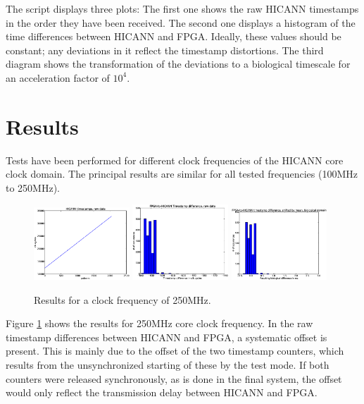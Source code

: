 \documentclass{article}
\begin{document}
The script displays three plots:
The first one shows the raw HICANN timestamps in the order they have been received.
The second one displays a histogram of the time differences between HICANN and FPGA.
Ideally, these values should be constant; any deviations in it reflect the timestamp distortions.
The third diagram shows the transformation of the deviations to a biological timescale for an acceleration factor of $10^4$.

\section{Results}

Tests have been performed for different clock frequencies of the HICANN core clock domain.
The principal results are similar for all tested frequencies (100MHz to 250MHz).

\begin{figure}
\includegraphics[width=0.32\textwidth ]{fig1_250mhz}
\includegraphics[width=0.32\textwidth ]{fig2_250mhz}
\includegraphics[width=0.32\textwidth ]{fig3_250mhz}
\caption{\label{fig_results} Results for a clock frequency of 250MHz.}
\end{figure}

Figure \ref{fig_results} shows the results for 250MHz core clock frequency.
In the raw timestamp differences between HICANN and FPGA, a systematic offset is present.
This is mainly due to the offset of the two timestamp counters, which results from the unsynchronized starting of these by the test mode.
If both counters were released synchronously, as is done in the final system, the offset would only reflect the transmission delay between HICANN and FPGA.
\end{document}
